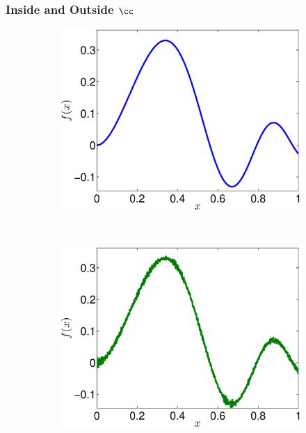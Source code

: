 \documentclass[11pt,compress]{beamer} %
\begin{document}
\begin{frame}
\frametitle{Inside and Outside $\cc$}
\begin{figure}\centering
\begin{subfigure}[b]{0.35\textwidth}
\includegraphics[width=1.\textwidth]{Images/fuzzy_FunctionWalshFourierCoeffDecay.eps}
\end{subfigure}
~ %
\begin{subfigure}[b]{0.35\textwidth}
\includegraphics[width=1.\textwidth]{Images/fuzzy_FilteredFunctionWalshFourierCoeffDecay.eps}
\end{subfigure}
\end{figure}
\vspace{-.5cm}

\end{frame}
\end{document}
